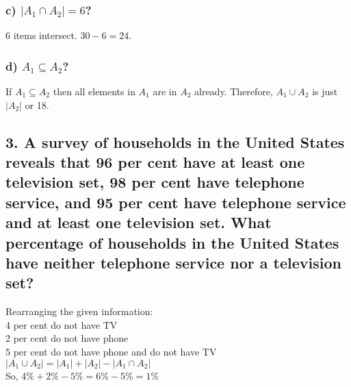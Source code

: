 \documentclass[11pt, oneside]{article} %
\numberwithin{equation}{section} %
\numberwithin{figure}{section} %
\numberwithin{table}{section} %
\begin{document}
\subsubsection{c) $|A_1 \cap A_2|=6$?}
6 items intersect. $30 -6 = 24$.
\subsubsection{d) $A_1 \subseteq A_2$?}
If $A_1 \subseteq A_2$ then all elements in $A_1$ are in $A_2$ already. Therefore, $A_1 \cup A_2$ is just $|A_2|$ or 18.


\subsection{3. A survey of households in the United States reveals that 96 per cent have at least one television set, 98 per cent have telephone service, and 95 per cent have telephone service and at least one television set. What percentage of households in the United States have neither telephone service nor a television set?}
Rearranging the given information: \\
4 per cent do not have TV \\
2 per cent do not have phone \\
5 per cent do not have phone and do not have TV \\
$|A_1 \cup A_2| = |A_1| + |A_2| - |A_1 \cap A_2|$ \\
So, $ 4\% + 2\% - 5\% = 6\% - 5\% = 1\%$

\end{document}
